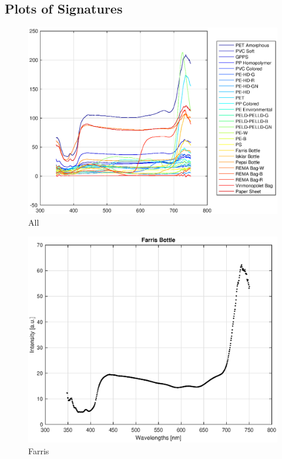 \begin{appendices}
\chapter{Plots of Signatures}
\label{app:signatures}

\begin{figure}
    \centering
    \includegraphics[width = 12cm]{Images/appendix/All.eps}
    \caption{All}
    \label{fig:all}
\end{figure}

\begin{figure}
    \centering
    \includegraphics[width = 12cm]{Images/appendix/farris.eps}
    \caption{Farris}
    \label{fig:my_label}
\end{figure}


\end{appendices}
